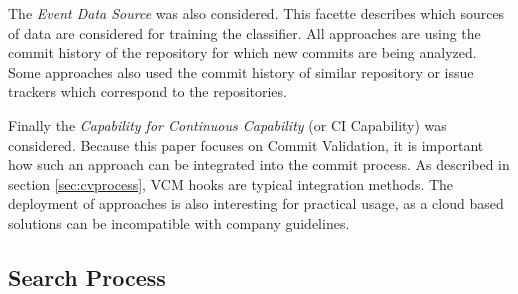 The \textit{Event Data Source} was also considered. This facette describes which sources of data are considered for training the classifier. All approaches are using the commit history of the repository for which new commits are being analyzed. Some approaches also used the commit history of similar repository or issue trackers which correspond to the repositories.

Finally the \textit{Capability for Continuous Capability} (or CI Capability) was considered. Because this paper focuses on Commit Validation, it is important how such an approach can be integrated into the commit process. As described in section \ref{sec:cvprocess}, VCM hooks are typical integration methods. The deployment of approaches is also interesting for practical usage, as a cloud based solutions can be incompatible with company guidelines.


\subsection{Search Process}
\label{sec:searchprocess}


